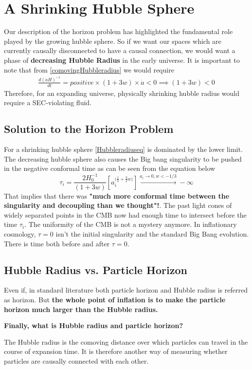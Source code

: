 \documentclass[12pt]{report}
\newcommand{\tbf}[1]{\textbf{#1}}
\newcommand{\de}[2]{\frac{d{#1}}{d{#2}}}
\begin{document}
\section{A Shrinking Hubble Sphere}
Our description of the horizon problem has highlighted the fundamental role played by the growing hubble sphere. So if we want our spaces which are currently causally disconnected to have a causal connection, we would want a phase of \tbf{decreasing Hubble Radius} in the early universe. It is important to note that from \eqref{comovingHubbleradius} we would require
\begin{eqnarray}
\de{(aH)^{-1}}{t} = positive \times (1+3w) \times \dot{a} <0 \implies (1+3w)<0
\end{eqnarray}
Therefore, for an expanding universe, physically shrinking hubble radius would require a SEC-violating fluid.
\subsection{Solution to the Horizon Problem}
For a shrinking hubble sphere \eqref{Hubbleradiuseq} is dominated by the lower limit. The decreasing hubble sphere also causes the Big bang singularity to be pushed in the negative conformal time as can be seen from the equation below
\begin{equation}
\tau_i=\frac{2H_0^{-1}}{(1+3w)} { \left[a_i^{({\frac{1}{2}+\frac{3}{2}w)}} \right] } \xrightarrow{{a_i \rightarrow 0, w<-1/3}} -\infty
\end{equation}
That implies that there was \tbf{"much more conformal time between the singularity and decoupling than we thought"!}. The past light cones of widely separated points in the CMB now had enough time to intersect before the time $\tau_i$. The uniformity of the CMB is not a mystery anymore. In inflationary cosmology, $\tau = 0$ isn't the initial singularity and the standard Big Bang evolution. There is time both before and after $\tau=0$.
\subsection{Hubble Radius vs. Particle Horizon}
Even if, in standard literature both particle horizon and Hubble radius is referred as horizon. But \tbf{the whole point of inflation is to make the particle horizon much larger than the Hubble radius.}

\tbf{Finally, what is Hubble radius and particle horizon?}

The Hubble radius is the comoving distance over which particles can travel in the course of expansion time. 	It is therefore another way of measuring whether particles are causally connected with each other. 
\end{document}
